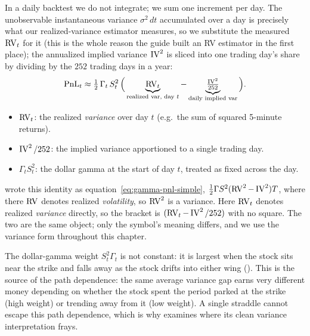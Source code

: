 In a daily backtest we do not integrate; we sum one increment per day. The unobservable instantaneous variance $\sigma^2\,dt$ accumulated over a day is precisely what our realized-variance estimator measures, so we substitute the measured $\operatorname{RV}_t$ for it (this is the whole reason the guide built an RV estimator in the first place); the annualized implied variance $\operatorname{IV}^2$ is sliced into one trading day's share by dividing by the $252$ trading days in a year:
\begin{equation}
\label{eq:ivrv:daily-discrete}
\text{PnL}_t \approx \tfrac{1}{2}\,\Gamma_t\,S_t^2\,\Big(\underbrace{\operatorname{RV}_t}_{\text{realized var, day }t} - \underbrace{\tfrac{\operatorname{IV}^2}{252}}_{\text{daily implied var}}\Big).
\end{equation}

\begin{itemize}
  \item $\operatorname{RV}_t$: the realized \emph{variance} over day $t$ (e.g.\ the sum of squared 5-minute returns).
  \item $\operatorname{IV}^2/252$: the implied variance apportioned to a single trading day.
  \item $\Gamma_t S_t^2$: the dollar gamma at the start of day $t$, treated as fixed across the day.
\end{itemize}

\begin{warning}
 wrote this identity as equation~\eqref{eq:gamma-pnl-simple}, $\tfrac12\Gamma S^2(\operatorname{RV}^2 - \operatorname{IV}^2)T$, where there $\operatorname{RV}$ denotes realized \emph{volatility}, so $\operatorname{RV}^2$ is a variance. Here $\operatorname{RV}_t$ denotes realized \emph{variance} directly, so the bracket is $(\operatorname{RV}_t - \operatorname{IV}^2/252)$ with no square. The two are the same object; only the symbol's meaning differs, and we use the variance form throughout this chapter.
\end{warning}

The dollar-gamma weight $S_t^2\Gamma_t$ is not constant: it is largest when the stock sits near the strike and falls away as the stock drifts into either wing (). This is the source of the path dependence: the same average variance gap earns very different money depending on whether the stock spent the period parked at the strike (high weight) or trending away from it (low weight). A single straddle cannot escape this path dependence, which is why  examines where its clean variance interpretation frays.

